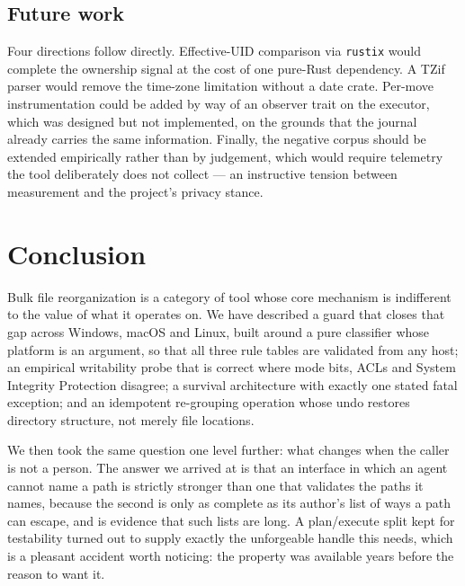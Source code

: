 \documentclass[11pt,a4paper]{article}
\newcommand{\code}[1]{\texttt{\small #1}}
\begin{document}
\subsection{Future work}

Four directions follow directly. Effective-UID comparison via \code{rustix} would
complete the ownership signal at the cost of one pure-Rust dependency. A TZif parser
would remove the time-zone limitation without a date crate. Per-move instrumentation
could be added by way of an observer trait on the executor, which was designed but not
implemented, on the grounds that the journal already carries the same information.
Finally, the negative corpus should be extended empirically rather than by judgement,
which would require telemetry the tool deliberately does not collect --- an instructive
tension between measurement and the project's privacy stance.

\section{Conclusion}
\label{sec:conclusion}

Bulk file reorganization is a category of tool whose core mechanism is indifferent to
the value of what it operates on. We have described a guard that closes that gap
across Windows, macOS and Linux, built around a pure classifier whose platform is an
argument, so that all three rule tables are validated from any host; an empirical
writability probe that is correct where mode bits, ACLs and System Integrity
Protection disagree; a survival architecture with exactly one stated fatal exception;
and an idempotent re-grouping operation whose undo restores directory structure, not
merely file locations.

We then took the same question one level further: what changes when the
caller is not a person. The answer we arrived at is that an interface in which
an agent cannot name a path is strictly stronger than one that validates the
paths it names, because the second is only as complete as its author's list of
ways a path can escape, and  is evidence that such lists are
long. A plan/execute split kept for testability turned out to supply exactly
the unforgeable handle this needs, which is a pleasant accident worth noticing:
the property was available years before the reason to want it.
\end{document}
